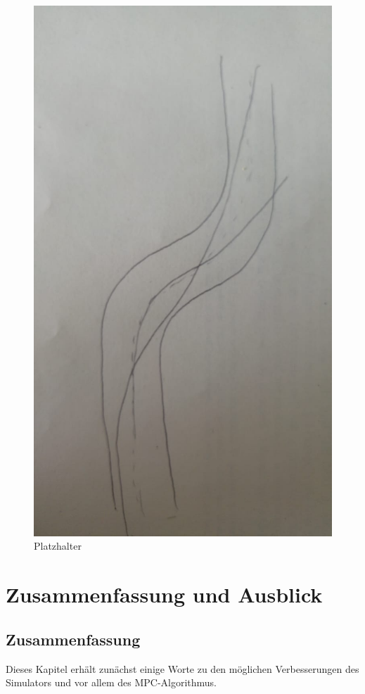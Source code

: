 \documentclass{like}
\begin{document}
\begin{figure}[ht!]
	\centering
	\includegraphics[width=350pt]{Abbildungen/quadraticCostFunction.png}
	\caption{Platzhalter}
	\label{fig:quadraticCostFunct}
\end{figure}

\chapter[Ausblick]{Zusammenfassung und Ausblick}
\section{Zusammenfassung}
Dieses Kapitel erhält zunächst einige Worte zu den möglichen Verbesserungen des Simulators und vor allem des \ac{MPC}-Algorithmus. 
\end{document}
